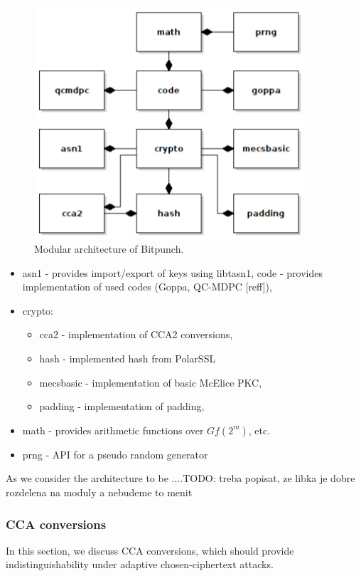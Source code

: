 \begin{figure}[!htbp]
	\centering
	\includegraphics[width=10cm]{img/architecture.png}
	\caption{Modular architecture of Bitpunch.}
	\label{architecture}
\end{figure}

\begin{itemize}
	\item asn1 - provides import/export of keys using libtasn1,
	code - provides implementation of used codes (Goppa, QC-MDPC [reff]),
	\item crypto: 
		\begin{itemize}
			\item cca2 - implementation of CCA2 conversions,
			\item hash - implemented hash from PolarSSL 
			\item mecsbasic - implementation of basic McElice PKC,
		\item padding - implementation of padding,
		\end{itemize} 
	\item math - provides arithmetic functions over $Gf(2^m)$, etc.
	\item prng - API for a pseudo random generator
\end{itemize} 
As we consider the architecture to be ....TODO: treba popisat, ze libka je dobre rozdelena na moduly a nebudeme to menit

\subsubsection{CCA conversions}
In this section, we discuss CCA conversions, which should provide indistinguishability under
adaptive chosen-ciphertext attacks.

